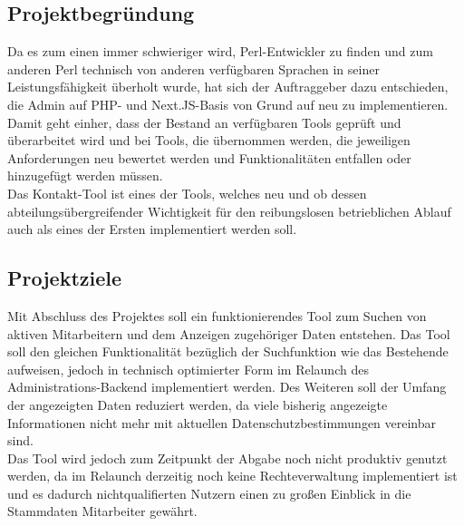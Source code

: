 \vfill
\pagebreak

\subsection{Projektbegründung}
    Da es zum einen immer schwieriger wird, Perl-Entwickler zu finden und zum anderen Perl technisch von anderen verfügbaren Sprachen in seiner Leistungsfähigkeit überholt wurde, hat sich der Auftraggeber dazu entschieden, die Admin auf PHP- und Next.JS-Basis von Grund auf neu zu implementieren. Damit geht einher, dass der Bestand an verfügbaren Tools geprüft und überarbeitet wird und bei Tools, die übernommen werden, die jeweiligen Anforderungen neu bewertet werden und Funktionalitäten entfallen oder hinzugefügt werden müssen.\\
    Das Kontakt-Tool ist eines der Tools, welches neu und ob dessen abteilungsübergreifender Wichtigkeit für den reibungslosen betrieblichen Ablauf auch als eines der Ersten implementiert werden soll.

\subsection{Projektziele}
    Mit Abschluss des Projektes soll ein funktionierendes Tool zum Suchen von aktiven Mitarbeitern und dem Anzeigen zugehöriger Daten entstehen. Das Tool soll den gleichen Funktionalität bezüglich der Suchfunktion wie das Bestehende aufweisen, jedoch in technisch optimierter Form im Relaunch des Administrations-Backend implementiert werden. Des Weiteren soll der Umfang der angezeigten Daten reduziert werden, da viele bisherig angezeigte Informationen nicht mehr mit aktuellen Datenschutzbestimmungen vereinbar sind.\\
    Das Tool wird jedoch zum Zeitpunkt der Abgabe noch nicht produktiv genutzt werden, da im Relaunch derzeitig noch keine Rechteverwaltung implementiert ist und es dadurch nichtqualifierten Nutzern einen zu großen Einblick in die Stammdaten Mitarbeiter gewährt.

\vfill
\pagebreak